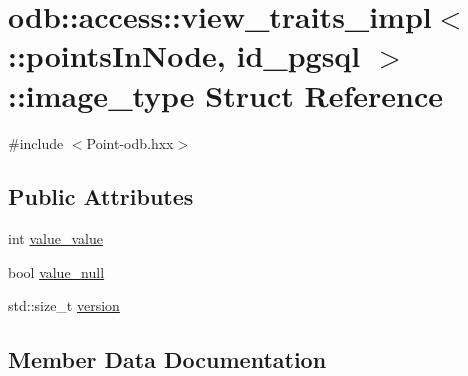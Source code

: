 \hypertarget{structodb_1_1access_1_1view__traits__impl_3_01_1_1points_in_node_00_01id__pgsql_01_4_1_1image__type}{}\section{odb\+:\+:access\+:\+:view\+\_\+traits\+\_\+impl$<$ \+:\+:points\+In\+Node, id\+\_\+pgsql $>$\+:\+:image\+\_\+type Struct Reference}
\label{structodb_1_1access_1_1view__traits__impl_3_01_1_1points_in_node_00_01id__pgsql_01_4_1_1image__type}


{\ttfamily \#include $<$Point-\/odb.\+hxx$>$}

\subsection*{Public Attributes}
\begin{DoxyCompactItemize}
\item 
int \hyperlink{structodb_1_1access_1_1view__traits__impl_3_01_1_1points_in_node_00_01id__pgsql_01_4_1_1image__type_a12f469d5bfe008819719093011ba4194}{value\+\_\+value}
\item 
bool \hyperlink{structodb_1_1access_1_1view__traits__impl_3_01_1_1points_in_node_00_01id__pgsql_01_4_1_1image__type_abafdefff55542ee083dbd9b32a575a3e}{value\+\_\+null}
\item 
std\+::size\+\_\+t \hyperlink{structodb_1_1access_1_1view__traits__impl_3_01_1_1points_in_node_00_01id__pgsql_01_4_1_1image__type_aee7068036e4034c258414d58c08360a3}{version}
\end{DoxyCompactItemize}


\subsection{Member Data Documentation}
\hypertarget{structodb_1_1access_1_1view__traits__impl_3_01_1_1points_in_node_00_01id__pgsql_01_4_1_1image__type_abafdefff55542ee083dbd9b32a575a3e}{}
